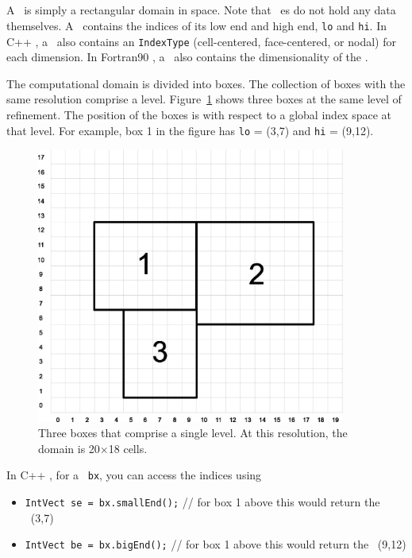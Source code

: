 \subsection{\BoxType}

A \BoxType\ is simply a rectangular domain in space.  Note that \BoxType~es
do not hold any data themselves. A \BoxType\ contains
the indices of its low end and high end, {\tt lo} and {\tt hi}.
In C++ \BoxLib, a \BoxType\ also
contains an {\tt IndexType} (cell-centered, face-centered, or nodal) for each
dimension.  In Fortran90 \BoxLib, a \BoxType\ also contains the dimensionality
of the \BoxType.

The computational domain is divided into boxes.  The collection of
boxes with the same resolution comprise a level.
Figure~\ref{fig:boxes} shows three boxes at the same level of
refinement.  The position of the boxes is with respect to a global
index space at that level.  For example, box 1 in the figure has 
{\tt lo} = (3,7) and {\tt hi} = (9,12).
\begin{figure}[h]
\centering
\includegraphics[width=4.0in]{./Overview/index_grid2}
\caption{\label{fig:boxes} Three boxes that comprise a single level.
At this resolution, the domain is 20$\times$18 cells.}
\end{figure}

In C++ \BoxLib, for a \BoxType\ {\tt bx},
you can access the indices using
\begin{itemize}
\item {{\tt IntVect se = bx.smallEnd();} // for box 1 above this would return
      the \IntVect\ (3,7)}
\item {{\tt IntVect be = bx.bigEnd();} // for box 1 above this would return 
      the \IntVect\ (9,12)}
\end{itemize}

